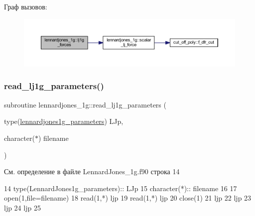 Граф вызовов\+:\nopagebreak
\begin{figure}[H]
\begin{center}
\leavevmode
\includegraphics[width=350pt]{namespacelennardjones__1g_a2581bad1eb2a8f6b8ecaa6d09de8f226_cgraph}
\end{center}
\end{figure}
\mbox{\label{namespacelennardjones__1g_aaf09aeeacdbe2a76adad336dde195938}} 
\subsubsection{\texorpdfstring{read\+\_\+lj1g\+\_\+parameters()}{read\_lj1g\_parameters()}}
{\footnotesize\ttfamily subroutine lennardjones\+\_\+1g\+::read\+\_\+lj1g\+\_\+parameters (\begin{DoxyParamCaption}\item[{type(\mbox{\hyperlink{structlennardjones__1g_1_1lennardjones1g__parameters}{lennardjones1g\+\_\+parameters}})}]{L\+Jp,  }\item[{character($\ast$)}]{filename }\end{DoxyParamCaption})}



См. определение в файле Lennard\+Jones\+\_\+1g.\+f90 строка 14


\begin{DoxyCode}
14     \textcolor{keywordtype}{type}(LennardJones1g\_parameters):: LJp
15     \textcolor{keywordtype}{character(*)}::  filename
16     
17     \textcolor{keyword}{open}(1,file=filename)
18     \textcolor{keyword}{read}(1,*) ljp%
19     \textcolor{keyword}{read}(1,*) ljp%
20     \textcolor{keyword}{close}(1)
21     ljp%
22     ljp%
23     ljp%
24     ljp%
25     
\end{DoxyCode}
\mbox{\label{namespacelennardjones__1g_a3bf6806cd81693117d84cb3f91adc6d5}} 
